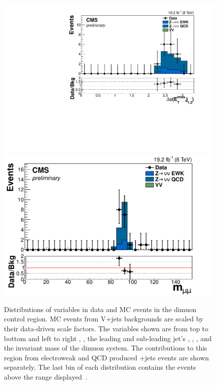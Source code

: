 \begin{figure}
  \includegraphics[width=.65\largefigwidth]{plots/parked/HIG-14-038-figs/output_sigreg/mumu_jetmetnomu_mindphi.pdf}
  \includegraphics[width=.65\largefigwidth]{plots/parked/HIG-14-038-figs/output_sigreg/mumu_m_mumu.pdf}
  \caption{Distributions of variables in data and \ac{MC} events in the dimuon control region. \ac{MC} events from V+jets backgrounds are scaled by their data-driven scale factors. The variables shown are from top to bottom and left to right \detajj, \Mjj, the leading and sub-leading jet's \pt, \METnoMU, \METsig, \jetmetdphileading and the invariant mass of the dimuon system. The contributions to this region from electroweak and \ac{QCD} produced \PZ+jets events are shown separately. The last bin of each distribution contains the events above the range displayed~\cite{CMS-PAS-HIG-14-038}.}
  \label{fig:parkedznunu}
\end{figure}

